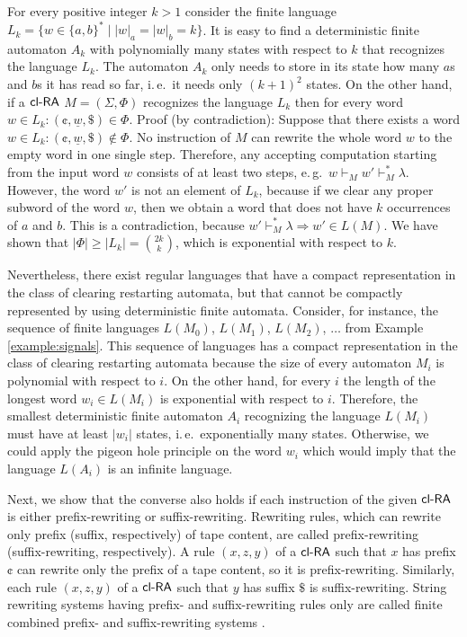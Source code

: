 \begin{example}\label{example:regular}
For every positive integer $k > 1$ consider the finite language $L_k = \{ w \in \{a, b\}^* \mid |w|_a = |w|_b = k \}$. It is easy to find a deterministic finite automaton $A_k$ with polynomially many states with respect to $k$ that recognizes the language $L_k$. The automaton $A_k$ only needs to store in its state how many $a$s and $b$s it has read so far, i.\,e.\ it needs only $(k+1)^2$ states. On the other hand, if a $\textup{\sf cl-RA\/}$ $M = (\Sigma, \Phi)$ recognizes the language $L_k$ then for every word $w \in L_k: (\cent, \underline{w}, \$) \in \Phi$. Proof (by contradiction): Suppose that there exists a word $w \in L_k: (\cent, \underline{w}, \$) \notin \Phi$. No instruction of $M$ can rewrite the whole word $w$ to the empty word in one single step. Therefore, any accepting computation starting from the input word $w$ consists of at least two steps, e.\,g.\ $w \vdash_M w' \vdash_M^* \lambda$.  However, the word $w'$ is not an element of $L_k$, because if we clear any proper subword of the word $w$, then we obtain a word that does not have $k$ occurrences of $a$ and $b$. This is a contradiction, because $w' \vdash_M^* \lambda \Rightarrow w' \in L(M)$. We have shown that $|\Phi| \ge |L_k| = \binom{2k}{k}$, which is exponential with respect to $k$.
\end{example}

Nevertheless, there exist regular languages that have a compact representation in the class of clearing restarting automata, but that cannot be compactly represented by using deterministic finite automata. Consider, for instance, the sequence of finite languages $L(M_0)$, $L(M_1)$, $L(M_2)$, $\ldots$ from Example \ref{example:signals}. This sequence of languages has a compact representation in the class of clearing restarting automata because the size of every automaton $M_i$ is polynomial with respect to $i$. On the other hand, for every $i$ the length of the longest word $w_i \in L(M_i)$ is exponential with respect to $i$. Therefore, the smallest deterministic finite automaton $A_i$ recognizing the language $L(M_i)$ must have at least $|w_i|$ states, i.\,e.\ exponentially many states. Otherwise, we could apply the pigeon hole principle on the word $w_i$ which would imply that the language $L(A_i)$ is an infinite language.

Next, we show that the converse also holds if each instruction of the given $\textup{\sf cl-RA\/}$ is either prefix-rewriting or suffix-rewriting. Rewriting rules, which can rewrite only prefix (suffix, respectively) of tape content, are called prefix-rewriting (suffix-rewriting, respectively). A rule $(x, z, y)$ of a $\textup{\sf cl-RA\/}$ such that $x$ has prefix $\cent$ can rewrite only the prefix of a tape content, so it is prefix-rewriting. Similarly, each rule $(x, z, y)$ of a $\textup{\sf cl-RA\/}$ such that $y$ has suffix $\$$ is suffix-rewriting. String rewriting systems having prefix- and suffix-rewriting rules only are called finite combined prefix- and suffix-rewriting systems \cite{Hofbauer2004301}.

